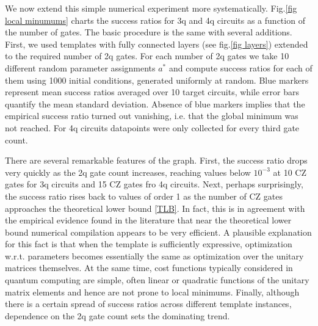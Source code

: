 \documentclass[amsfonts, amssymb, aps, nofootinbib, twocolumn]{revtex4-2}
\newcommand{\CZ}{CZ }
\begin{document}
We now extend this simple numerical experiment more systematically. Fig.\ref{fig local minumums} charts the success ratios for 3q and 4q circuits as a function of the number of gates. The basic procedure is the same with several additions. First, we used templates with fully connected layers (see fig.\ref{fig layers}) extended to the required number of 2q gates. For each number of 2q gates we take 10 different random parameter assignments $a^*$ and compute success ratios for each of them using 1000 initial conditions, generated uniformly at random. Blue markers represent mean success ratios averaged over 10 target circuits, while error bars quantify the mean standard deviation. Absence of blue markers implies that the empirical success ratio turned out vanishing, i.e. that the global minimum was not reached. For 4q circuits datapoints were only collected for every third gate count.

There are several remarkable features of the graph. First, the success ratio drops very quickly as the 2q gate count increases, reaching values below $10^{-3}$ at 10 \CZ gates for 3q circuits and 15 \CZ gates fro 4q circuits. Next, perhaps surprisingly, the success ratio rises back to values of order 1 as the number of \CZ gates approaches the theoretical lower bound \eqref{TLB}. In fact, this is in agreement with the empirical evidence found in the literature \cite{Madden2021, Rakyta2021, Kiani2020} that near the theoretical lower bound numerical compilation appears to be very efficient. A plausible explanation for this fact \cite{Ge2022} is that when the template is sufficiently expressive, optimization w.r.t. parameters becomes essentially the same as optimization over the unitary matrices themselves. At the same time, cost functions typically considered in quantum computing are simple, often linear or quadratic functions of the unitary matrix elements and hence are not prone to local minimums. Finally, although there is a certain spread of success ratios across different template instances, dependence on the 2q gate count sets the dominating trend.
\end{document}
